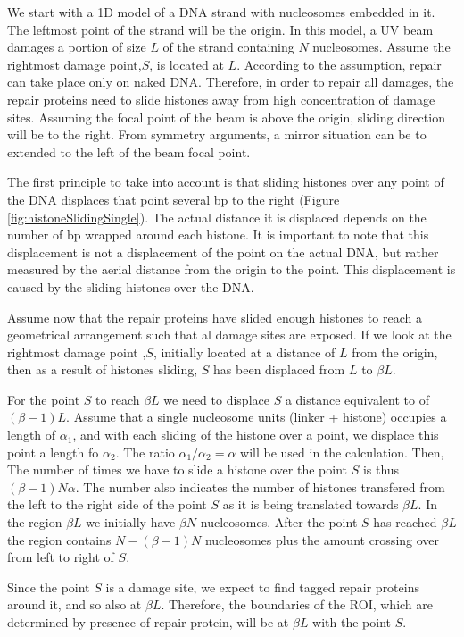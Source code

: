 \documentclass[12pt]{report}
\begin{document}
   We start with a 1D model of a DNA strand with nucleosomes embedded in it. The leftmost point of the strand will be the origin. In this model, a UV beam damages a portion of size $L$ of the strand containing $N$ nucleosomes. Assume the rightmost damage point,$S$, is located at $L$. According to the assumption, repair can take place only on naked DNA. Therefore, in order to repair all damages, the repair proteins need to slide histones away from high concentration of damage sites. Assuming the focal point of the beam is above the origin, sliding direction will be to the right. From symmetry arguments, a mirror situation can be to extended to the left of the beam focal point.     
   
   The first principle to take into account is that sliding histones over any point of the DNA displaces that point several bp to the right (Figure \ref{fig:histoneSlidingSingle}). The actual distance it is displaced depends on the number of bp wrapped around each histone. It is important to note that this displacement is not a displacement of the point on the actual DNA, but rather measured by the aerial distance from the origin to the point. This displacement is caused by the sliding histones over the DNA.
   
   Assume now that the repair proteins have slided enough histones to reach a geometrical arrangement such that al damage sites are exposed. If we look at the rightmost damage point ,$S$, initially located at a distance of $L$ from the origin, then as a result of histones sliding, $S$ has been displaced from $L$ to $\beta L$. 
   
   For the point $S$ to reach $\beta L$ we need to displace $S$ a distance equivalent to of $(\beta-1)L$. Assume that a single nucleosome units (linker + histone) occupies a length of $\alpha_1$, and with each sliding of the histone over a point, we displace this point a length fo $\alpha_2$. The ratio $\alpha_1/\alpha_2 =\alpha$ will be used in the calculation. Then, The number of times we have to slide a histone over the point $S$ is thus $(\beta-1)N\alpha$.
   The number also indicates the number of histones transfered from the left to the right side of the point $S$ as it is being translated towards $\beta L$.
   In the region $\beta L$ we initially have $\beta N$ nucleosomes. After the point $S$ has reached $\beta L$ the region contains $N-(\beta-1)N$ nucleosomes plus the amount crossing over from left to right of $S$. 
   
   Since the point $S$ is a damage site, we expect to find tagged repair proteins around it, and so also at $\beta L$. Therefore, the  boundaries of the ROI, which are determined by presence of repair protein, will be at $\beta L$ with the point $S$. 
   
\end{document}
